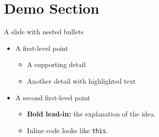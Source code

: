 \section[Demo Section]{Demo Section}

\begin{frame}{A slide with nested bullets}
    \begin{itemize}
        \item A first-level point
        \begin{itemize}
            \item A supporting detail
            \item Another detail with \alert{highlighted text}
        \end{itemize}

        \item A second first-level point
        \begin{itemize}
            \item \textbf{Bold lead-in:} the explanation of the idea.
            \item Inline code looks like \texttt{this}.
        \end{itemize}
    \end{itemize}
\end{frame}

